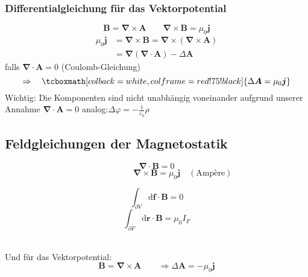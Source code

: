 \documentclass[titlepage,11pt,a4paper,ngerman]{report}
\newcommand{\tx}[1]{\textrm{#1}}
\newcommand{\dd}{\tx{d}}
\renewcommand{\vec}[1]{\boldsymbol{#1}}
\renewcommand{\epsilon}{\varepsilon}
\newcommand{\vabla}{\boldsymbol{\nabla}}
\newcommand{\rmbox}[1]{\tcboxmath[colback=white,colframe=red!75!black]{#1}}
\begin{document}
\subsubsection{Differentialgleichung für das Vektorpotential}

\begin{equation*}
\vec{B} = \vabla \times \vec{A} \qquad \vabla \times \vec{B} = \mu_0 \vec{j}
\end{equation*}
\begin{align*}
\mu_0 \vec{j} &= \vabla \times \vec{B} = \vabla \times (\vabla \times \vec{A})\\
&= \vabla(\vabla \cdot \vec{A}) - \Delta \vec{A}
\end{align*}
falls $ \vabla\cdot \vec{A} = 0 $ (Coulomb-Gleichung)
\begin{equation*}
\Rightarrow \quad \rmbox{\Delta \vec{A} = \mu_0 \vec{j}}
\end{equation*}
Wichtig: Die Komponenten sind nicht unabhängig voneinander aufgrund unserer Annahme $ \vabla \cdot \vec{A} = 0 $
analog:$ \Delta \varphi = - \frac{1}{\epsilon_0} \rho $

\subsection{Feldgleichungen der Magnetostatik}

\begin{minipage}{.5\linewidth}
	\begin{equation*}
	\vabla \cdot \vec{B} = 0
	\end{equation*}
	\vspace{-5pt}
	\begin{equation*}
	\phantom{\quad (\tx{Amp\`ere})} \vabla \times \vec{B} = \mu_0 \vec{j} \quad (\tx{Amp\`ere})
	\end{equation*}
\end{minipage}%
\begin{minipage}{.5\linewidth}
	\begin{equation*}
	\int_{\partial V} \dd \vec{f} \cdot \vec{B} = 0
	\end{equation*}
	\begin{equation*}
	\int_{\partial F} \dd \vec{r} \cdot \vec{B} = \mu_0 I_F
	\end{equation*}
\end{minipage}%
\\
Und für das Vektorpotential:
\begin{equation*}
\vec{B} = \vabla \times \vec{A} \qquad \Rightarrow \Delta  \vec{A} = - \mu_0 \vec{j}
\end{equation*}
\end{document}
